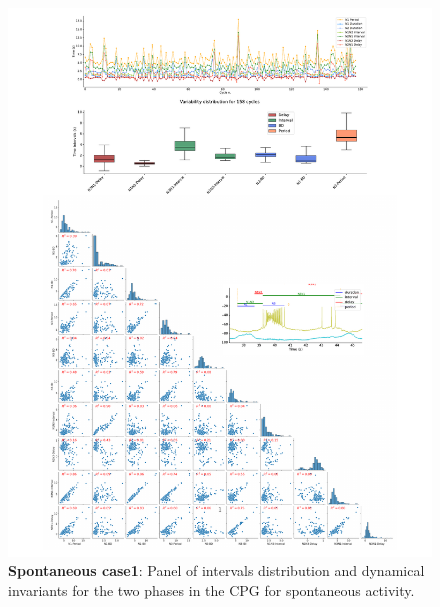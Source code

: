 \begin{figure}[htbp]
	\centering
	\includegraphics[width=1.1\textwidth]{./invariants/data/SUSSEX/prep1/images/2phases/panel_with_pairplot.pdf}
	\caption{\textbf{Spontaneous case1}: Panel of intervals distribution and dynamical invariants for the two phases in the CPG for spontaneous activity.}
	\label{fig:prep1 2 phases invariants pairplot}
\end{figure}



